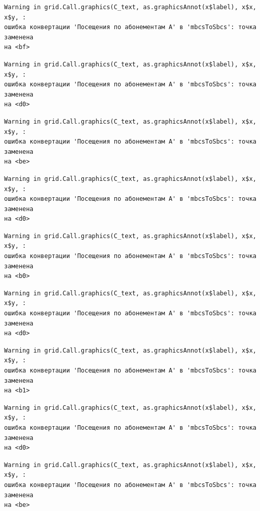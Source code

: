 \documentclass[
  letterpaper,
  DIV=11,
  numbers=noendperiod]{scrreprt}
\begin{document}
\begin{verbatim}
Warning in grid.Call.graphics(C_text, as.graphicsAnnot(x$label), x$x, x$y, :
ошибка конвертации 'Посещения по абонементам А' в 'mbcsToSbcs': точка заменена
на <bf>
\end{verbatim}

\begin{verbatim}
Warning in grid.Call.graphics(C_text, as.graphicsAnnot(x$label), x$x, x$y, :
ошибка конвертации 'Посещения по абонементам А' в 'mbcsToSbcs': точка заменена
на <d0>
\end{verbatim}

\begin{verbatim}
Warning in grid.Call.graphics(C_text, as.graphicsAnnot(x$label), x$x, x$y, :
ошибка конвертации 'Посещения по абонементам А' в 'mbcsToSbcs': точка заменена
на <be>
\end{verbatim}

\begin{verbatim}
Warning in grid.Call.graphics(C_text, as.graphicsAnnot(x$label), x$x, x$y, :
ошибка конвертации 'Посещения по абонементам А' в 'mbcsToSbcs': точка заменена
на <d0>
\end{verbatim}

\begin{verbatim}
Warning in grid.Call.graphics(C_text, as.graphicsAnnot(x$label), x$x, x$y, :
ошибка конвертации 'Посещения по абонементам А' в 'mbcsToSbcs': точка заменена
на <b0>
\end{verbatim}

\begin{verbatim}
Warning in grid.Call.graphics(C_text, as.graphicsAnnot(x$label), x$x, x$y, :
ошибка конвертации 'Посещения по абонементам А' в 'mbcsToSbcs': точка заменена
на <d0>
\end{verbatim}

\begin{verbatim}
Warning in grid.Call.graphics(C_text, as.graphicsAnnot(x$label), x$x, x$y, :
ошибка конвертации 'Посещения по абонементам А' в 'mbcsToSbcs': точка заменена
на <b1>
\end{verbatim}

\begin{verbatim}
Warning in grid.Call.graphics(C_text, as.graphicsAnnot(x$label), x$x, x$y, :
ошибка конвертации 'Посещения по абонементам А' в 'mbcsToSbcs': точка заменена
на <d0>
\end{verbatim}

\begin{verbatim}
Warning in grid.Call.graphics(C_text, as.graphicsAnnot(x$label), x$x, x$y, :
ошибка конвертации 'Посещения по абонементам А' в 'mbcsToSbcs': точка заменена
на <be>
\end{verbatim}
\end{document}
